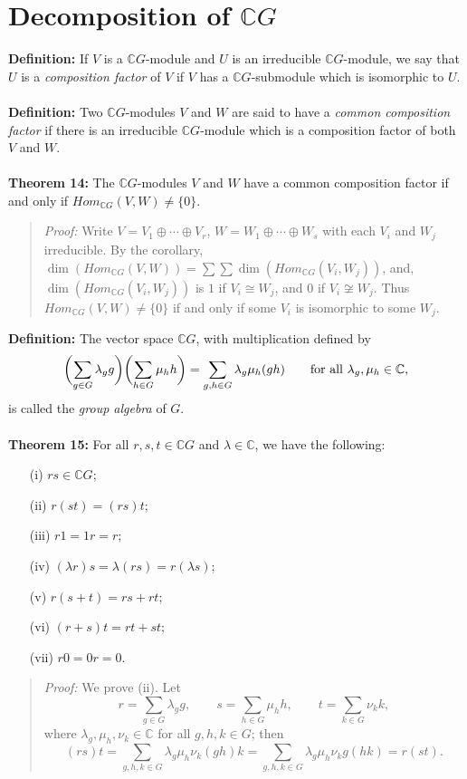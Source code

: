 \section {Decomposition of ${\mathbb C}G$}
{\bf Definition:} If $V$ is a ${\mathbb C}G$-module and $U$ is an irreducible
${\mathbb C}G$-module, we say that $U$ is a \emph{composition factor} of $V$ if $V$ has
a ${\mathbb C}G$-submodule which is isomorphic to $U$.
\\
\\
{\bf Definition:} Two ${\mathbb C}G$-modules $V$ and $W$ are said to have a
\emph{common composition factor} if there is an irreducible ${\mathbb C}G$-module which
is a composition factor of both $V$ and $W$.
\\
\\
{\bf Theorem 14:} The ${\mathbb C}G$-modules $V$ and $W$ have a common
composition factor if and only if $ Hom_{{\mathbb C}G}(V,W)\neq\{0\}$.
\begin{quote}
\emph{Proof:}
Write $V=V_1\oplus\cdots\oplus V_r$, $W=W_1\oplus\cdots\oplus W_s$ with
each $V_i$ and $W_j$ irreducible. By the corollary,
$\dim( Hom_{{\mathbb C}G}(V,W))=\sum\sum\dim( Hom_{{\mathbb C}G}(V_i,W_j))$, and, 
$\dim( Hom_{{\mathbb C}G}(V_i,W_j))$ is $1$ if $V_i\cong W_j$, and $0$ if
$V_i \not\cong W_j$. Thus $ Hom_{{\mathbb C}G}(V,W) \neq \{0\}$ if and only if some $V_i$ is
isomorphic to some $W_j$.
\end{quote}
{\bf Definition:} The vector space ${\mathbb C}G$, with multiplication defined
by
$$\biggl(\sum_{g\in G}\lambda_gg\biggr)\biggl(\sum_{h\in G}\mu_hh\biggr)
=\sum_{g,h\in G}\lambda_g\mu_h(gh)\qquad\hbox{for all }\lambda_g,\mu_h\in{\mathbb C},$$
is called the  \emph{group algebra} of $G$.
\\
\\
{\bf Theorem 15:} For all $r,s,t\in{\mathbb C}G$ and $\lambda\in{\mathbb C}$, we
have the following:
\begin{itemize}
\item[(i)] $rs\in{\mathbb C}G$;
\item[(ii)] $r(st)=(rs)t$;
\item[(iii)] $r1=1r=r$;
\item[(iv)] $(\lambda r)s=\lambda(rs)=r(\lambda s)$;
\item[(v)] $r(s+t)=rs+rt$;
\item[(vi)] $(r+s)t=rt+st$;
\item[(vii)] $r0=0r=0$.
\end{itemize}
\begin{quote}
\emph{Proof:}
We prove (ii).  Let
$$r=\sum_{g\in G}\lambda_gg,\qquad s=\sum_{h\in G}\mu_hh,\qquad
t=\sum_{k\in G}\nu_kk,$$
where $\lambda_g,\mu_h,\nu_k\in{\mathbb C}$ for all $g,h,k\in G$; then
$$(rs)t=\sum_{g,h,k\in G}\lambda_g\mu_h\nu_k(gh)k
=\sum_{g,h,k\in G}\lambda_g\mu_h\nu_kg(hk)=r(st).$$
\end{quote}
